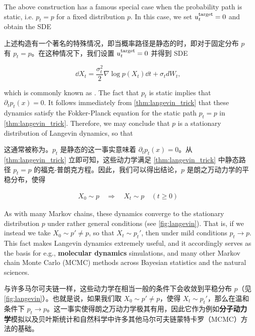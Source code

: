 \begin{remarkbox}
The above construction has a famous special case when the probability path is static, i.e. $p_t=p$ for a fixed distribution $p$. In this case, we set $u^{\text{target}}_t=0$ and obtain the SDE

上述构造有一个著名的特殊情况，即当概率路径是静态的时，即对于固定分布 $p$ 有 $p_t=p$。在这种情况下，我们设置 $u^{\text{target}}_t=0$ 并得到 SDE

\begin{equation}
    \dd X_t = \frac{\sigma_t^2}{2}\nabla\log p(X_t)\dd t + \sigma_t dW_t \label{eq:langevin_dynamics},
\end{equation}

which is commonly known as . The fact that $p_t$ is static implies that $\partial_tp_t(x)=0$. It follows immediately from \cref{thm:langevin_trick} that these dynamics satisfy the Fokker-Planck equation for the static path $p_t=p$ in \cref{thm:langevin_trick}. Therefore, we may conclude that $p$ is a stationary distribution of Langevin dynamics, so that

这通常被称为。$p_t$ 是静态的这一事实意味着 $\partial_tp_t(x)=0$。从 \cref{thm:langevin_trick} 立即可知，这些动力学满足 \cref{thm:langevin_trick} 中静态路径 $p_t=p$ 的福克-普朗克方程。因此，我们可以得出结论，$p$ 是朗之万动力学的平稳分布，使得

\begin{align*}
    X_0 \sim p\quad \Rightarrow \quad X_t \sim p\quad (t\geq 0)
\end{align*}

As with many Markov chains, these dynamics converge to the stationary distribution $p$ under rather general conditions (see \cref{fig:langevin}). That is, if we instead we take $X_0 \sim p' \neq p$, so that $X_t \sim p_t'$, then under mild conditions $p_t \to p$. This fact makes Langevin dynamics extremely useful, and it accordingly serves as the basis for e.g., \textbf{molecular dynamics} simulations, and many other Markov chain Monte Carlo (MCMC) methods across Bayesian statistics and the natural sciences.

与许多马尔可夫链一样，这些动力学在相当一般的条件下会收敛到平稳分布 $p$（见 \cref{fig:langevin}）。也就是说，如果我们取 $X_0 \sim p' \neq p$，使得 $X_t \sim p_t'$，那么在温和条件下 $p_t \to p$。这一事实使得朗之万动力学极其有用，因此它作为例如\textbf{分子动力学}模拟以及贝叶斯统计和自然科学中许多其他马尔可夫链蒙特卡罗（MCMC）方法的基础。
\end{remarkbox}

